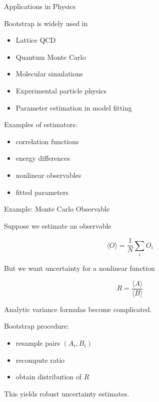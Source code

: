 \documentclass{beamer}
\begin{document}
\begin{frame}{Applications in Physics}

Bootstrap is widely used in

\begin{itemize}

\item Lattice QCD
\item Quantum Monte Carlo
\item Molecular simulations
\item Experimental particle physics
\item Parameter estimation in model fitting

\end{itemize}

Examples of estimators:

\begin{itemize}

\item correlation functions
\item energy differences
\item nonlinear observables
\item fitted parameters
\end{itemize}
\end{frame}


\begin{frame}{Example: Monte Carlo Observable}

Suppose we estimate an observable

\[
\langle O \rangle
=
\frac{1}{N}\sum_i O_i
\]

But we want uncertainty for a nonlinear function

\[
R = \frac{\langle A \rangle}{\langle B \rangle}
\]

Analytic variance formulas become complicated.

Bootstrap procedure:

\begin{itemize}

\item resample pairs $(A_i,B_i)$
\item recompute ratio
\item obtain distribution of $R$

\end{itemize}

This yields robust uncertainty estimates.
\end{frame}
\end{document}
